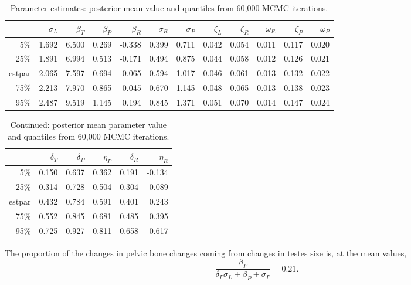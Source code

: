 \documentclass{article}
\begin{document}
\begin{table}[ht]
\centering
\begin{tabular}{rrrrrrrrrrrr}
  \hline
 & $\sigma_L$ & $\beta_T$ & $\beta_P$ & $\beta_R$ & $\sigma_R$ & $\sigma_P$ & $\zeta_L$ & $\zeta_R$ & $\omega_R$ & $\zeta_P$ & $\omega_P$ \\ 
  \hline
5\% & 1.692 & 6.500 & 0.269 & -0.338 & 0.399 & 0.711 & 0.042 & 0.054 & 0.011 & 0.117 & 0.020 \\ 
  25\% & 1.891 & 6.994 & 0.513 & -0.171 & 0.494 & 0.875 & 0.044 & 0.058 & 0.012 & 0.126 & 0.021 \\ 
  estpar & 2.065 & 7.597 & 0.694 & -0.065 & 0.594 & 1.017 & 0.046 & 0.061 & 0.013 & 0.132 & 0.022 \\ 
  75\% & 2.213 & 7.970 & 0.865 & 0.045 & 0.670 & 1.145 & 0.048 & 0.065 & 0.013 & 0.138 & 0.023 \\ 
  95\% & 2.487 & 9.519 & 1.145 & 0.194 & 0.845 & 1.371 & 0.051 & 0.070 & 0.014 & 0.147 & 0.024 \\ 
   \hline
\end{tabular}
\caption{Parameter estimates: posterior mean value and quantiles from 60,000 MCMC iterations.}
\end{table}



\begin{table}[ht]
\centering
\begin{tabular}{rrrrrr}
  \hline
 & $\delta_T$ & $\delta_P$ & $\eta_P$ & $\delta_R$ & $\eta_R$ \\ 
  \hline
5\% & 0.150 & 0.637 & 0.362 & 0.191 & -0.134 \\ 
  25\% & 0.314 & 0.728 & 0.504 & 0.304 & 0.089 \\ 
  estpar & 0.432 & 0.784 & 0.591 & 0.401 & 0.243 \\ 
  75\% & 0.552 & 0.845 & 0.681 & 0.485 & 0.395 \\ 
  95\% & 0.725 & 0.927 & 0.811 & 0.658 & 0.617 \\ 
   \hline
\end{tabular}
\caption{Continued: posterior mean parameter value and quantiles from 60,000 MCMC iterations.}
\end{table}

The proportion of the changes in pelvic bone changes coming from changes in testes size is, at the mean values,
\[
\frac{\beta_P}{ \delta_P \sigma_L + \beta_P + \sigma_P } = 0.21 .
\]
\end{document}
